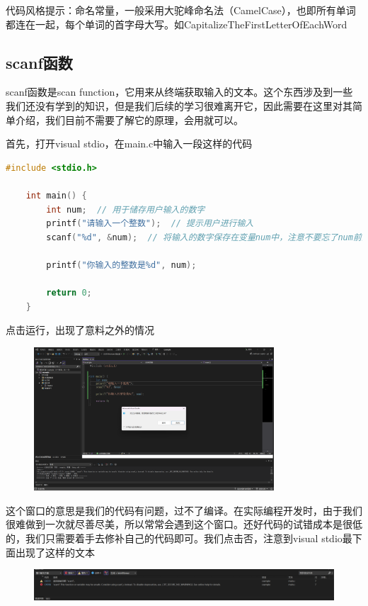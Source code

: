 代码风格提示：命名常量，一般采用大驼峰命名法（CamelCase），也即所有单词都连在一起，每个单词的首字母大写。如CapitalizeTheFirstLetterOfEachWord

\subsection{scanf函数}

scanf函数是scan function，它用来从终端获取输入的文本。这个东西涉及到一些我们还没有学到的知识，但是我们后续的学习很难离开它，因此需要在这里对其简单介绍，我们目前不需要了解它的原理，会用就可以。

首先，打开visual stdio，在main.c中输入一段这样的代码

\begin{lstlisting}[language=C]
    #include <stdio.h>

    int main() {
        int num;  // 用于储存用户输入的数字
        printf("请输入一个整数");  // 提示用户进行输入
        scanf("%d", &num);  // 将输入的数字保存在变量num中，注意不要忘了num前的&

        printf("你输入的整数是%d", num);

        return 0;
    }
\end{lstlisting}

点击运行，出现了意料之外的情况

\begin{figure}[H]
    \centering
    \includegraphics[width=0.8\textwidth, height=0.4\textheight]{images/1标准输入报错.png}
\end{figure}

这个窗口的意思是我们的代码有问题，过不了编译。在实际编程开发时，由于我们很难做到一次就尽善尽美，所以常常会遇到这个窗口。还好代码的试错成本是很低的，我们只需要着手去修补自己的代码即可。我们点击否，注意到visual stdio最下面出现了这样的文本

\begin{figure}[H]
    \centering
    \includegraphics[width=\textwidth, height=0.2\textheight]{images/1ide错误提示.png}
\end{figure}

